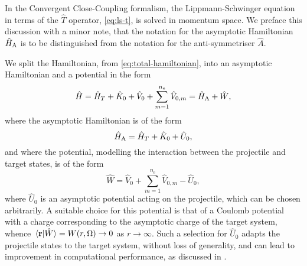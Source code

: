 \documentclass[draft]{article}
\begin{document}
In the Convergent Close-Coupling formalism, the Lippmann-Schwinger equation in
terms of the $\hat{T}$ operator, \autoref{eq:ls-t}, is solved in momentum space.
We preface this discussion with a minor note, that the notation for the
asymptotic Hamiltonian $\hat{H}_{\rm{A}}$ is to be distinguished from the
notation for the anti-symmetriser $\hat{A}$.

We split the Hamiltonian, from \autoref{eq:total-hamiltonian}, into an
asymptotic Hamiltonian and a potential in the form
\begin{equation}
  \label{eq:ccc-hamiltonian}
  \hat{H}
  =
  \hat{H}_{T}
  +
  \hat{K}_{0}
  +
  \hat{V}_{0}
  +
  \sum_{m = 1}^{n_{\mathrm{e}}}
  \hat{V}_{0, m}
  =
  \hat{H}_{\rm{A}}
  +
  \hat{W}
  ,
\end{equation}
where the asymptotic Hamiltonian is of the form
\begin{equation}
  \label{eq:ccc-asymptotic-hamiltonian}
  \hat{H}_{\rm{A}}
  =
  \hat{H}_{T}
  +
  \hat{K}_{0}
  +
  \hat{U}_{0}
  ,
\end{equation}
and where the potential, modelling the interaction between the projectile and
target states, is of the form
\begin{equation}
  \label{eq:ccc-potential}
  \hat{W}
  =
  \hat{V}_{0}
  +
  \sum_{m = 1}^{n_{\mathrm{e}}}
  \hat{V}_{0, m}
  -
  \hat{U}_{0}
  ,
\end{equation}
where $\hat{U}_{0}$ is an asymptotic potential acting on the projectile, which
can be chosen arbitrarily.
A suitable choice for this potential is that of a Coulomb potential with a
charge corresponding to the asymptotic charge of the target system, whence
$\braket*{\vb{r}}{\hat{W}} = W(r, \Omega) \to 0$ as $r \to \infty$.
Such a selection for $\hat{U}_{0}$ adapts the projectile states to the target
system, without loss of generality, and can lead to improvement in computational
performance, as discussed in \cite[204]{AJP_BRAY1996}.
\end{document}
